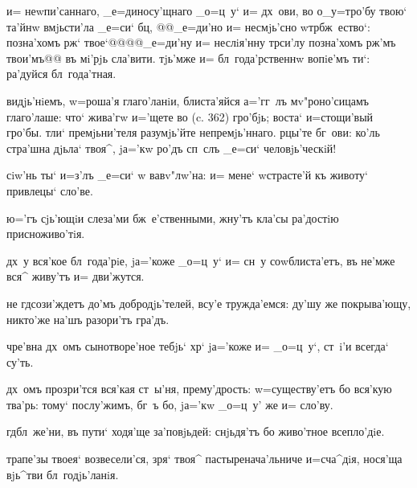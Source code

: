 {{     
и= неwпи'саннаго, _е=диносу'щнаго _о=ц~у` и= дх~ови, во 
о_у=тро'бу твою` та'йнw вмjьсти'ла _е=си` бц, 
@@_е=ди'но и= несмjь'сно w\т тр бж~ество`: позна'хомъ 
рж` твое`@@{@@_е=ди'ну и= неслiя'нну тр си'лу 
позна'хомъ рж'мъ твои'мъ@@} въ мi'рjь сла'вити. 
тjь'мже и= бл~года'рственнw вопiе'мъ ти`: ра'дуйся 
бл~года'тная.


 видjь'нiемъ, w=роша'я глаго'ланiи, 
блиста'яйся а='гг~лъ мv"роно'сицамъ глаго'лаше: что` 
жива'гw и='щете во (c. 362) гро'бjь; воста` и=стощи'вый 
гро'бы. тли` премjьни'теля разумjь'йте непремjь'ннаго. 
рцы'те бг~ови: ко'ль стра'шна дjьла` твоя^, jа='кw ро'дъ 
сп~слъ _е=си` человjь'ческiй!


 сiw'нь ты` и=з'лъ _е=си` w\т 
вавv"лw'на: и= мене` w\т страсте'й къ животу` привлецы` 
сло'ве.

 ю='гъ сjь'ющiи слеза'ми бж~е'ственными, жну'тъ 
кла'сы ра'достiю присноживо'тiя.

  дх~у вся'кое бл~года'рiе, jа='коже 
_о=ц~у` и= сн~у соwблиста'етъ, въ не'мже вся^ живу'тъ и= 
дви'жутся.


 не гд сози'ждетъ до'мъ добродjь'телей, 
всу'е тружда'емся: ду'шу же покрыва'ющу, никто'же на'шъ 
разори'тъ гра'дъ.

 чре'вна дх~омъ сынотворе'ное тебjь` хр` 
jа='коже и= _о=ц~у`, ст~i'и всегда` су'ть.

  дх~омъ прозри'тся вся'кая ст~ы'ня, 
прему'дрость: w=существу'етъ бо вся'кую тва'рь: тому` 
послу'жимъ, бг~ъ бо, jа='кw _о=ц~у' же и= сло'ву.



 гд бл~же'ни, въ пути` ходя'ще 
за'повjьдей: снjьдя'тъ бо живо'тное всепло'дiе.

 трапе'зы твоея` возвесели'ся, зря` 
твоя^ пастыренача'льниче и=сча^дiя, нося'ща вjь^тви 
бл~годjь'ланiя.

}}

